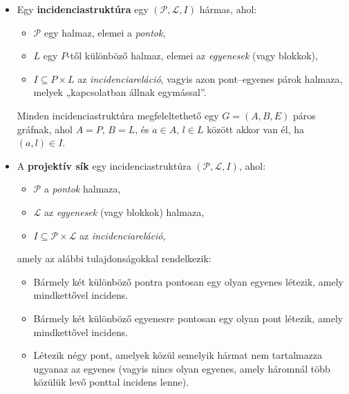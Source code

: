 \documentclass[12pt,a4paper]{article}
\begin{document}
\begin{itemize}
    \item Egy \textbf{incidenciastruktúra} egy $(\mathcal{P}, \mathcal{L}, I)$ hármas, ahol:
    \begin{itemize}[nosep]
      \item $\mathcal{P}$ egy halmaz, elemei a \emph{pontok},
      \item $L$ egy $P$-től különböző halmaz, elemei az \emph{egyenesek} (vagy blokkok),
      \item $I \subseteq P \times L$ az \emph{incidenciareláció}, vagyis azon pont–egyenes párok halmaza, melyek „kapcsolatban állnak egymással”.
    \end{itemize}
    Minden incidenciastruktúra megfeleltethető egy $G = (A, B, E)$ páros gráfnak, ahol $A = P$, $B = L$, és $a \in A$, $l \in L$ között akkor van él, ha $(a, l) \in I$.
    \item A \textbf{projektív sík} egy incidenciastruktúra $(\mathcal{P}, \mathcal{L}, I)$, ahol:
    \begin{itemize}[nosep]
      \item $\mathcal{P}$ a \emph{pontok} halmaza,
      \item $\mathcal{L}$ az \emph{egyenesek} (vagy blokkok) halmaza,
      \item $I \subseteq \mathcal{P} \times \mathcal{L}$ az \emph{incidenciareláció},
    \end{itemize}
    amely az alábbi tulajdonságokkal rendelkezik:
    \begin{itemize}[nosep]
      \item Bármely két különböző pontra pontosan egy olyan egyenes létezik, amely mindkettővel incidens.
      \item Bármely két különböző egyenesre pontosan egy olyan pont létezik, amely mindkettővel incidens.
      \item Létezik négy pont, amelyek közül semelyik hármat nem tartalmazza ugyanaz az egyenes (vagyis nincs olyan egyenes, amely háromnál több közülük levő ponttal incidens lenne).
    \end{itemize}
    

\end{itemize}
\end{document}
